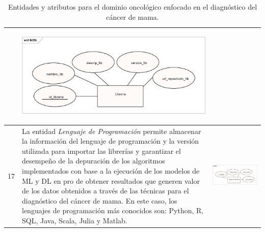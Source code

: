\begin{table}
\begin{threeparttable}
\begin{tabular}{p{0.5cm} p{7cm} p{7cm}}
			& \begin{center}\includegraphics[width=1\linewidth]{MER/IMAGENES_MER/16_LIBRERIA}\end{center}
			\\ \hline
			17
			& La entidad \textit{Lenguaje de Programación} permite almacenar la información del lenguaje de programación y la versión utilizada para importar las librerías y garantizar el desempeño de la depuración de los algoritmos implementados con base a la ejecución de los modelos de ML y DL en pro de obtener resultados que generen valor de los datos obtenidos a través de las técnicas para el diagnóstico del cáncer de mama. En este caso, los lenguajes de programación más conocidos son: Python, R, SQL, Java, Scala, Julia y Matlab.  
			& \begin{center}\includegraphics[width=1\linewidth]{MER/IMAGENES_MER/17_LENGUAJE_PROGRAMACION}\end{center}
			\\ \hline
		\end{tabular}
		\caption{Entidades y atributos para el dominio oncológico enfocado en el diagnóstico del cáncer de mama.}
		\label{tablaMER}
	\end{threeparttable}
\end{table}

